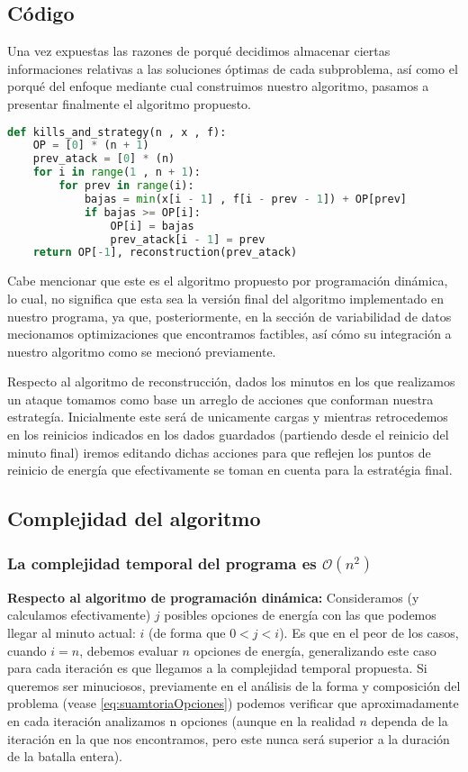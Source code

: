 \subsection{Código}
Una vez expuestas las razones de porqué decidimos almacenar ciertas informaciones relativas a las soluciones óptimas de cada subproblema, así como el porqué del enfoque mediante cual construimos nuestro algoritmo, pasamos a presentar finalmente el algoritmo propuesto.

\begin{lstlisting}[language=Python]
def kills_and_strategy(n , x , f):
    OP = [0] * (n + 1)
    prev_atack = [0] * (n)
    for i in range(1 , n + 1):
        for prev in range(i):
            bajas = min(x[i - 1] , f[i - prev - 1]) + OP[prev]
            if bajas >= OP[i]:
                OP[i] = bajas
                prev_atack[i - 1] = prev
    return OP[-1], reconstruction(prev_atack)
\end{lstlisting}

Cabe mencionar que este es el algoritmo propuesto por programación dinámica, lo cual, no significa que esta sea la versión final del algoritmo implementado en nuestro programa, ya que, posteriormente, en la sección de variabilidad de datos mecionamos optimizaciones que encontramos factibles, así cómo su integración a nuestro algoritmo como se mecionó previamente.  


Respecto al algoritmo de reconstrucción, dados los minutos en los que realizamos un ataque tomamos como base un arreglo de acciones que conforman nuestra estrategía. Inicialmente este será de unicamente cargas y mientras retrocedemos en los reinicios indicados en los dados guardados (partiendo desde el reinicio del minuto final) iremos editando dichas acciones para que reflejen los puntos de reinicio de energía que efectivamente se toman en cuenta para la estratégia final. 

\subsection{Complejidad del algoritmo}\label{sec:complexity}

\subsubsection{La complejidad temporal del programa  es  $\mathcal{O}(n^{2})$ }
\textbf{Respecto al algoritmo de programación dinámica:}
Consideramos (y calculamos efectivamente) $j$ posibles opciones de energía con las que podemos llegar al minuto actual: $i$ (de forma que $0<j<i$). Es que en el peor de los casos, cuando $i=n$, debemos evaluar $n$ opciones de energía, generalizando este caso para cada iteración es que llegamos a la complejidad temporal propuesta. Si queremos ser minuciosos, previamente en el análisis de la forma y composición del problema (vease \ref{eq:suamtoriaOpciones}) podemos verificar que aproximadamente en cada iteración analizamos n opciones (aunque en la realidad $n$ dependa de la iteración en la que nos encontramos, pero este nunca será superior a la duración de la batalla entera).

